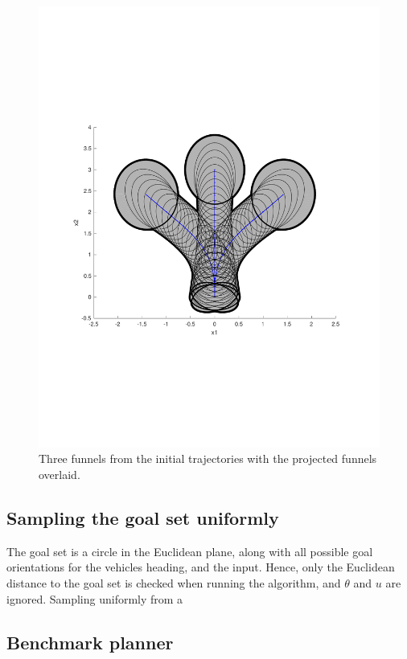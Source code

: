\begin{figure}
  \centering
  \includegraphics[scale=.5]{figures/experiments/sample-funnel-overlay}
  \caption{Three funnels from the initial trajectories with the projected
    funnels overlaid.}
  \label{fig:sample-funnel-overlay}
\end{figure}

\subsection{Sampling the goal set uniformly}

The goal set is a circle in the Euclidean plane, along with all possible goal
orientations for the vehicles heading, and the input. Hence, only the Euclidean
distance to the goal set is checked when running the algorithm, and \(\theta\)
and \(u\) are ignored. Sampling uniformly from a 

\subsection{Benchmark planner}

